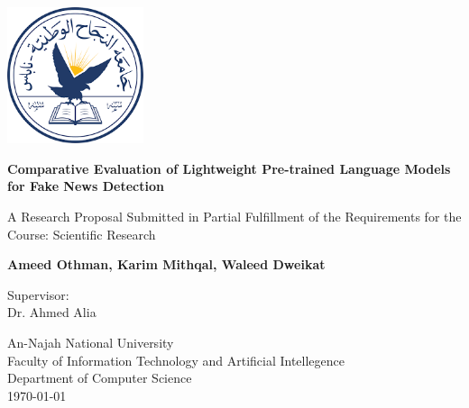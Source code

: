 \documentclass{article}
\begin{document}
\begin{titlepage}
    \centering
    \vspace*{1cm}
    
    \includegraphics[width=0.3\textwidth]{logo.png}\par\vspace{1cm} %
    
    \Huge
    \textbf{Comparative Evaluation of Lightweight Pre-trained Language Models for Fake News Detection}
    
    \vspace{0.5cm}
    \LARGE
    A Research Proposal Submitted in Partial Fulfillment of the Requirements for the Course: Scientific Research
    
    \vspace{1.5cm}
    
    \textbf{Ameed Othman, Karim Mithqal, Waleed Dweikat}
    
    \vfill
    
    \Large
    Supervisor: \\
    Dr. Ahmed Alia \\
    
    \vspace{0.8cm}
    
    \Large
    An-Najah National University \\
    Faculty of Information Technology and Artificial Intellegence \\
    Department of Computer Science \\
    {\small \today}
    
\end{titlepage}


\newpage
\end{document}
